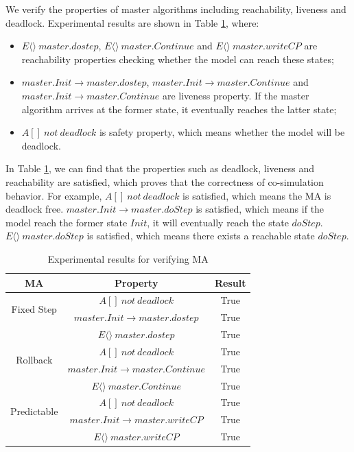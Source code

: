  
We verify the properties of master algorithms including reachability, liveness and deadlock. Experimental results are shown in Table \ref{ta_r}, where:

\begin{itemize}
\item
$E \langle\rangle ~master.dostep$, $E\langle\rangle~master.Continue$ and $E\langle\rangle~master.writeCP$ are reachability properties checking whether the model can reach these states;
\item
$master.Init \rightarrow master.dostep$, $master.Init \rightarrow master.Continue$ and $master.Init \rightarrow master.Continue$ are liveness property. If the master algorithm arrives at the former state, it eventually reaches the latter state;
\item
$A[]~not~deadlock$ is safety property, which means whether the model will be deadlock.
\end{itemize}

In Table \ref{ta_r}, we can find that the properties such as deadlock, liveness and reachability are satisfied,  which proves that the correctness of co-simulation behavior. For example, $A[]~not~deadlock$ is satisfied, which means the MA is deadlock free. $master.Init \rightarrow master.doStep$ is satisfied, which means if the model reach the former state $Init$, it will eventually reach the state $doStep$. $E\langle\rangle~master.doStep$ is satisfied, which means there exists a reachable state $doStep$. 

\begin{table}
\caption{Experimental results for verifying MA}
\centering
\begin{tabular}{c c c}
        \hline
        MA & Property & Result\\
        \hline
        \multirow{2}{2.0cm}{Fixed Step}
                & $A[]~not~deadlock$ & True\\
                & $master.Init \rightarrow master.dostep$ & True\\
                & $E\langle\rangle~master.dostep$ & True\\

        \hline
        \multirow{2}{2.0cm}{Rollback}
                & $A[]~not~deadlock$ & True\\
                & $master.Init \rightarrow master.Continue$ & True\\
                & $E\langle\rangle~master.Continue$ & True\\

        \hline
        \multirow{2}{2.0cm}{Predictable}
                & $A[]~not~deadlock$ & True\\
                & $master.Init \rightarrow  master.writeCP$ & True\\
                & $E\langle\rangle~master.writeCP$ & True\\
        \hline
\end{tabular}
\label{ta_r}
\end{table}

